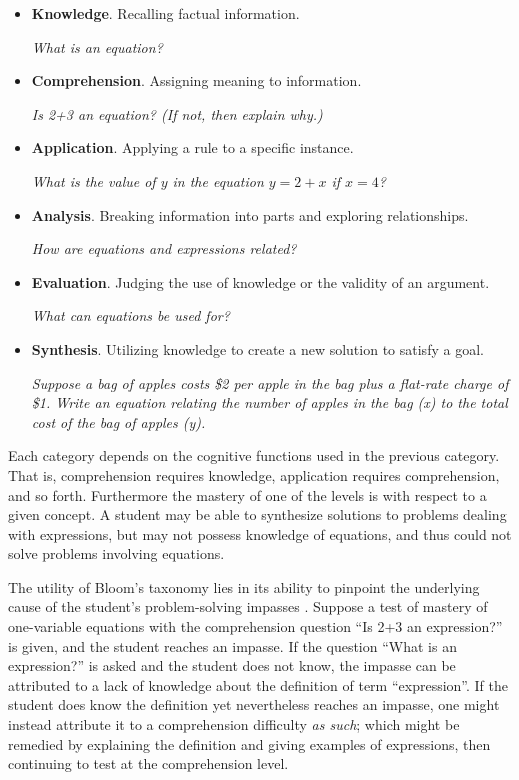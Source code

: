\documentclass[a4paper,twocolumn]{article}
\begin{document}
\begin{itemize}

\item \textbf{Knowledge}. Recalling factual information.

\emph{What is an equation?}

\item \textbf{Comprehension}. Assigning meaning to information.

\emph{Is 2+3 an equation? (If not, then explain why.)}

\item \textbf{Application}. Applying a rule to a specific instance.

\emph{What is the value of $y$ in the equation $y = 2 + x$ if $x = 4$?}

\item \textbf{Analysis}. Breaking information into parts and exploring
relationships.

\emph{How are equations and expressions related?}

\item \textbf{Evaluation}. Judging the use of knowledge or the validity of an
argument.

\emph{What can equations be used for?}

\item \textbf{Synthesis}. Utilizing knowledge to create a new solution to
satisfy a goal.

\emph{Suppose a bag of apples costs \$2 per apple in the bag plus a flat-rate
charge of \$1.  Write an equation relating the number of apples in the bag (x)
to the total cost of the bag of apples (y).}

\end{itemize}

Each category depends on the cognitive functions used in the previous category.
That is, comprehension requires knowledge, application requires comprehension,
and so forth.  Furthermore the mastery of one of the levels is with respect to
a given concept.  A student may be able to synthesize solutions to problems
dealing with expressions, but may not possess knowledge of equations, and thus
could not solve problems involving equations.

The utility of Bloom's taxonomy lies in its ability to pinpoint the underlying
cause of the student's problem-solving impasses \cite{shuhidan2011}.  Suppose a
test of mastery of one-variable equations with the comprehension question ``Is
2+3 an expression?'' is given, and the student reaches an impasse.  If the
question ``What is an expression?'' is asked and the student does not know, the
impasse can be attributed to a lack of knowledge about the definition of term
``expression''.  If the student does know the definition yet nevertheless
reaches an impasse, one might instead attribute it to a comprehension
difficulty \emph{as such}; which might be remedied by explaining the definition
and giving examples of expressions, then continuing to test at the
comprehension level.
\end{document}
